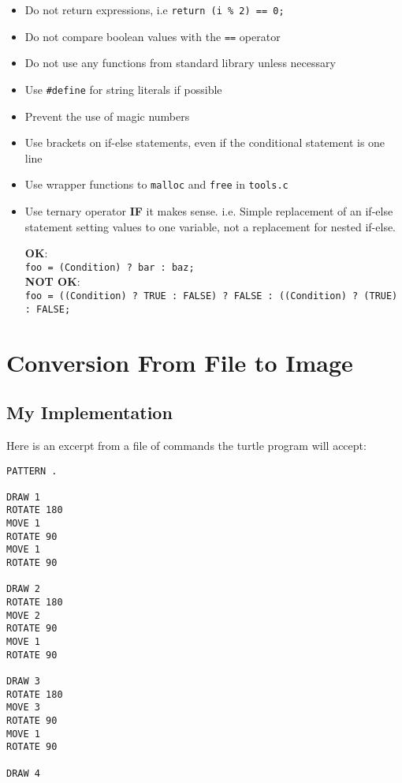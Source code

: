 \documentclass[a4paper, 12pt, titlepage]{article}
\newcommand{\code}[1]{\small\texttt{#1}\normalsize}
\begin{document}
\begin{itemize}[label={--}]
    \item Do not return expressions, i.e \code{return (i \% 2) == 0;}
    \item Do not compare boolean values with the \code{==} operator
    \item Do not use any functions from standard library unless necessary
    \item Use \code{\#define} for string literals if possible
    \item Prevent the use of magic numbers
    \item Use brackets on if-else statements, even if the conditional
          statement is one line
    \item Use wrapper functions to \code{malloc} and \code{free} in
          \code{tools.c}
    \item Use ternary operator \textbf{IF} it makes sense. i.e. Simple
          replacement of an if-else statement setting values to one variable,
          not a replacement for nested if-else.

          \textbf{OK}:
          \\\code{foo = (Condition) ? bar : baz;}\\
          \textbf{NOT OK}:
          \\\code{foo = ((Condition) ? TRUE : FALSE) ? FALSE : ((Condition) ? (TRUE) : FALSE;}
\end{itemize}

\newpage


\section{Conversion From File to Image}

\subsection{My Implementation}

Here is an excerpt from a file of commands the turtle program will accept:

\begin{lstlisting}
PATTERN .

DRAW 1
ROTATE 180
MOVE 1
ROTATE 90
MOVE 1
ROTATE 90

DRAW 2
ROTATE 180
MOVE 2
ROTATE 90
MOVE 1
ROTATE 90

DRAW 3
ROTATE 180
MOVE 3
ROTATE 90
MOVE 1
ROTATE 90

DRAW 4
\end{lstlisting}
\end{document}
